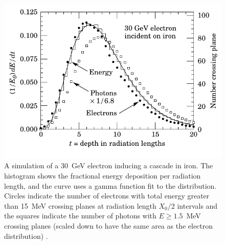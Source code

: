 \begin{figure}[hbtm]
 \centering
 \includegraphics[scale=1.4,keepaspectratio=true]{./ElecCascadeInIron.pdf}
 \caption{A simulation of a 30~GeV electron inducing a cascade in iron. The histogram shows the fractional energy deposition per radiation length, and the curve uses a gamma function fit to the distribution. Circles indicate the number of electrons with total energy greater than 15~MeV crossing planes at radiation length $X_{0}/2$ intervals and the squares indicate the number of photons with $E\geq 1.5$~MeV crossing planes (scaled down to have the same area as the electron distribution) \cite{pap:PDG}.}
 \label{fig:ElecCascadeInIron}
\end{figure}


